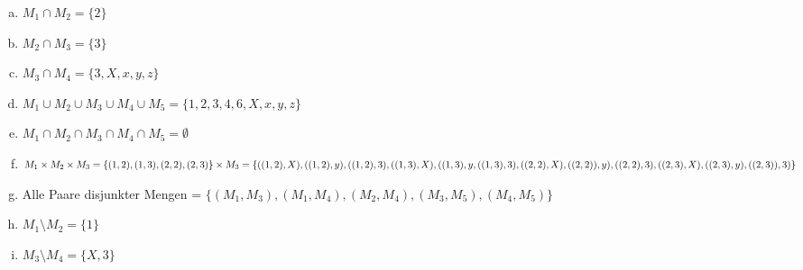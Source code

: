 \documentclass{standalone}
\begin{document}
\begin{enumerate}[a)]
    \item $M_1 \cap M_2 = \{2\}$
    \item $M_2 \cap M_3 = \{3\}$
    \item $M_3 \cap M_4 = \{3,X,x,y,z\}$
    \item $M_1 \cup M_2 \cup M_3 \cup M_4 \cup M_5 = \{1,2,3,4,6,X,x,y,z\} $
    \item $M_1 \cap M_2 \cap M_3 \cap M_4 \cap M_5 = \emptyset$
    \item $M_1 \times M_2 \times M_3 = \{(1,2),(1,3),(2,2),(2,3)\} \times M_3 = \\
    \{((1,2),X),((1,2),y),((1,2),3),((1,3),X),((1,3),y,((1,3),3),\\((2,2),X),((2,2)),y),((2,2),3),((2,3),X),((2,3),y),((2,3)),3)\}$
    \item Alle Paare disjunkter Mengen = $\{(M_1,M_3),(M_1,M_4),(M_2,M_4),(M_3,M_5),(M_4,M_5)\}$
    \item $M_1 \setminus M_2 = \{1\}$
    \item $M_3 \setminus M_4 = \{X,3\}$
\end{enumerate}
\end{document}
